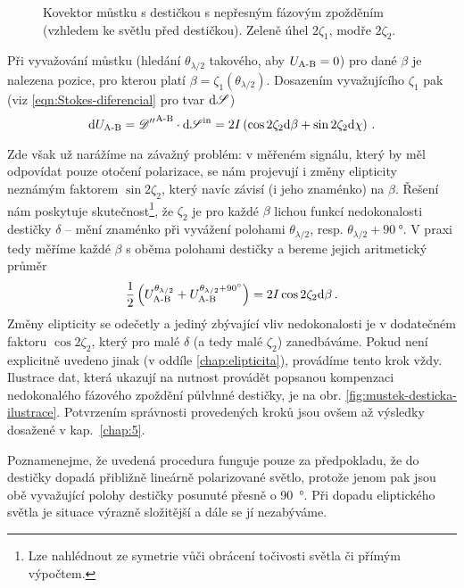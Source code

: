 \begin{figure}[htbp]
    \centering
    
    \caption{Kovektor můstku s destičkou s nepřesným fázovým zpožděním (vzhledem ke světlu před destičkou). Zeleně úhel $2\zeta_1$, modře $2\zeta_2$.}
    \label{fig:mustek-nedokonale-desticka}
\end{figure}

Při vyvažování můstku (hledání $\theta_{\lambda/2}$ takového, aby $U_\textrm{A-B}=0$) pro dané $\beta$ je nalezena pozice, pro kterou platí $\beta=\zeta_1(\theta_{\lambda/2})$.
Dosazením vyvažujícího $\zeta_1$ pak (viz \eqref{eqn:Stokes-diferencial} pro tvar $\textrm{d}\mathscr{S}$)
\begin{equation}
\label{eqn:mustek-s-elipticitou}
    \textrm{d}U_\textrm{A-B} = {\mathscr{D}''}^\textrm{A-B} \cdot \textrm{d}\mathscr{S}^\textrm{in} = 2I\left(\cos2\zeta_2 \textrm{d}\beta + \sin2\zeta_2\textrm{d}\chi\right)  \,.
\end{equation}

Zde však už narážíme na závažný problém: v měřeném signálu, který by měl odpovídat pouze otočení polarizace, se nám projevují i změny elipticity neznámým faktorem $\sin2\zeta_2$, který navíc závisí (i jeho znaménko) na $\beta$.
Řešení nám poskytuje skutečnost\footnote{Lze nahlédnout ze symetrie vůči obrácení točivosti světla či přímým výpočtem.}, že $\zeta_2$ je pro každé $\beta$ lichou funkcí nedokonalosti destičky $\delta$ -- mění znaménko při vyvážení polohami $\theta_{\lambda/2}$, resp. $\theta_{\lambda/2}+\SI{90}{\degree}$.
V praxi tedy měříme každé $\beta$ s oběma polohami destičky a bereme jejich aritmetický průměr
\begin{equation}
\label{eqn:mustek-kompenzace-desticek-prumer}
    \frac{1}{2}\left(U_\textrm{A-B}^{\theta_{\lambda/2}}+U_\textrm{A-B}^{\theta_{\lambda/2}+\SI{90}{\degree}}\right) = 2I\cos2\zeta_2 \textrm{d}\beta \,.
\end{equation}
Změny elipticity se odečetly a jediný zbývající vliv nedokonalosti je v dodatečném faktoru $\cos2\zeta_2$, který pro malé $\delta$ (a tedy malé $\zeta_2$) zanedbáváme.
Pokud není explicitně uvedeno jinak (v oddíle \ref{chap:elipticita}), provádíme tento krok vždy.
Ilustrace dat, která ukazují na nutnost provádět popsanou kompenzaci nedokonalého fázového zpoždění půlvlnné destičky, je na obr. \ref{fig:mustek-desticka-ilustrace}.
Potvrzením správnosti provedených kroků jsou ovšem až výsledky dosažené v kap.~\ref{chap:5}.

Poznamenejme, že uvedená procedura funguje pouze za předpokladu, že do destičky dopadá přibližně lineárně polarizované světlo, protože jenom pak jsou obě vyvažující polohy destičky posunuté přesně o \SI{90}{\degree}.
Při dopadu eliptického světla je situace výrazně složitější a dále se jí nezabýváme.

